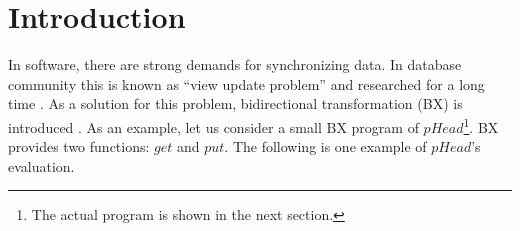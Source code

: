 \section{Introduction}



In software, there are strong demands for synchronizing data. In database community this is known as ``view update problem'' and researched for a long time \cite{viewupdate}.
As a solution for this problem, bidirectional transformation (BX) is introduced \cite{}. As an example, let us consider a small BX program of $pHead$\footnote{The actual program is shown in the next section.}. BX provides two functions: $get$ and $put$. The following is one example of $pHead$'s evaluation.

